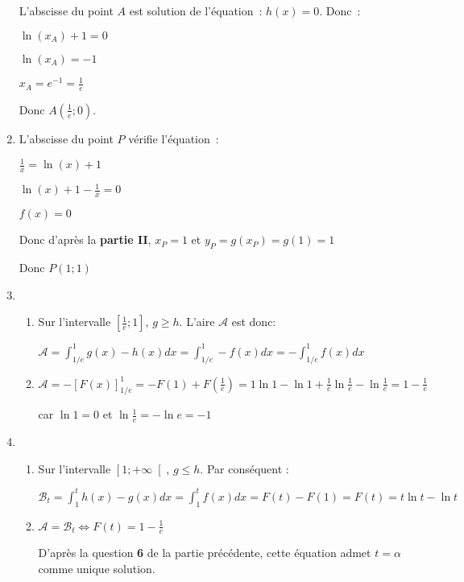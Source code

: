 \begin{corrige}
\begin{enumerate}
          L'abscisse du point $A$ est solution de l'équation : $h\left(x\right)=0$. Donc :
          \par
          $\ln\left(x_{A}\right)+1=0$
          \par
          $\ln\left(x_{A}\right)=-1$
          \par
          $x_{A}=e^{-1}=\frac{1}{e}$
          \par
          Donc $A\left(\frac{1}{e};0\right)$.
          \item
          L'abscisse du point $P$ vérifie l'équation :
          \par
          $\frac{1}{x}=\ln\left(x\right)+1$
          \par
          $\ln\left(x\right)+1-\frac{1}{x}=0$
          \par
          $f\left(x\right)=0$
          \par
          Donc d'après la\textbf{ partie II},  $x_{P}=1$ et $y_{P}=g\left(x_{P}\right)=g\left(1\right)=1$
          \par
          Donc $P\left(1;1\right)$
          \item
          \begin{enumerate}[label=\alph*.]
               \item
               Sur l'intervalle $\left[\frac{1}{e} ; 1\right]$, $g\geqslant h$. L'aire $\mathscr A$ est donc:
               \par
               $\mathscr A=\int_{1/e}^{1}g\left(x\right)-h\left(x\right)dx = \int_{1/e}^{1}-f\left(x\right)dx = -\int_{1/e}^{1}f\left(x\right)dx$
               \item
               $\mathscr A=-\left[F\left(x\right)\right]_{1/e}^{1} = -F\left(1\right)+F\left(\frac{1}{e}\right) = 1\ln 1-\ln 1+\frac{1}{e} \ln \frac{1}{e}-\ln \frac{1}{e} = 1-\frac{1}{e}$
               \par
               car $\ln 1 = 0 $ et $ \ln \frac{1}{e} = -\ln e = -1$
          \end{enumerate}
          \item
          \begin{enumerate}[label=\alph*.]
               \item
               Sur l'intervalle $\left[1 ; +\infty \right[$, $g\leqslant h$. Par conséquent :
               \par
               $\mathscr B_{t}=\int_{1}^{t}h\left(x\right)-g\left(x\right)dx = \int_{1}^{t}f\left(x\right)dx = F\left(t\right)-F\left(1\right) = F\left(t\right) = t \ln t-\ln t$
               \item
               $\mathscr A=\mathscr B_{t}   \Leftrightarrow    F\left(t\right) = 1-\frac{1}{e}$
               \par
               D'après la question \textbf{6} de la partie précédente, cette équation admet $t=\alpha $ comme unique solution.
          \end{enumerate}
     \end{enumerate}
\end{corrige}
